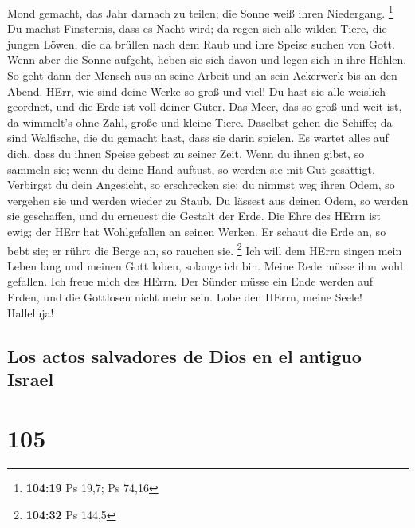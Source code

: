 Mond gemacht, das Jahr darnach zu teilen; die Sonne weiß ihren
Niedergang. \footnote{\textbf{104:19} Ps 19,7; Ps 74,16} 
Du machst Finsternis, dass es Nacht wird; da regen sich alle wilden
Tiere,  die jungen Löwen, die da brüllen nach dem Raub
und ihre Speise suchen von Gott.  Wenn aber die Sonne
aufgeht, heben sie sich davon und legen sich in ihre Höhlen.
 So geht dann der Mensch aus an seine Arbeit und an sein
Ackerwerk bis an den Abend.  HErr, wie sind deine Werke
so groß und viel! Du hast sie alle weislich geordnet, und die Erde ist
voll deiner Güter.  Das Meer, das so groß und weit ist,
da wimmelt's ohne Zahl, große und kleine Tiere.  Daselbst
gehen die Schiffe; da sind Walfische, die du gemacht hast, dass sie
darin spielen.  Es wartet alles auf dich, dass du ihnen
Speise gebest zu seiner Zeit.  Wenn du ihnen gibst, so
sammeln sie; wenn du deine Hand auftust, so werden sie mit Gut
gesättigt.  Verbirgst du dein Angesicht, so erschrecken
sie; du nimmst weg ihren Odem, so vergehen sie und werden wieder zu
Staub.  Du lässest aus deinen Odem, so werden sie
geschaffen, und du erneuest die Gestalt der Erde.  Die
Ehre des HErrn ist ewig; der HErr hat Wohlgefallen an seinen Werken.
 Er schaut die Erde an, so bebt sie; er rührt die Berge
an, so rauchen sie. \footnote{\textbf{104:32} Ps 144,5} 
Ich will dem HErrn singen mein Leben lang und meinen Gott loben, solange
ich bin.  Meine Rede müsse ihm wohl gefallen. Ich freue
mich des HErrn.  Der Sünder müsse ein Ende werden auf
Erden, und die Gottlosen nicht mehr sein. Lobe den HErrn, meine Seele!
Halleluja!

\hypertarget{los-actos-salvadores-de-dios-en-el-antiguo-israel}{%
\subsection{Los actos salvadores de Dios en el antiguo
Israel}\label{los-actos-salvadores-de-dios-en-el-antiguo-israel}}

\hypertarget{section-104}{%
\section{105}\label{section-104}}

